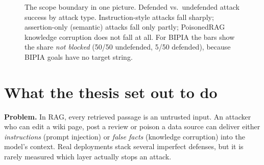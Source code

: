 \documentclass[11pt,a4paper]{article}
\begin{document}
\begin{figure}[h]
\centering
{}
\caption{The scope boundary in one picture. Defended vs.\ undefended attack success by attack type. Instruction-style
attacks fall sharply; assertion-only (semantic) attacks fall only partly; PoisonedRAG knowledge corruption does
not fall at all. For BIPIA the bars show the share \emph{not blocked} (50/50 undefended, 5/50 defended), because
BIPIA goals have no target string.}
\label{fig:scope}
\end{figure}

\section{What the thesis set out to do}

\textbf{Problem.} In RAG, every retrieved passage is an untrusted input. An attacker who can edit a wiki page,
post a review or poison a data source can deliver either \emph{instructions} (prompt injection) or \emph{false
facts} (knowledge corruption) into the model's context. Real deployments stack several imperfect defenses, but it
is rarely measured which layer actually stops an attack.
\end{document}
